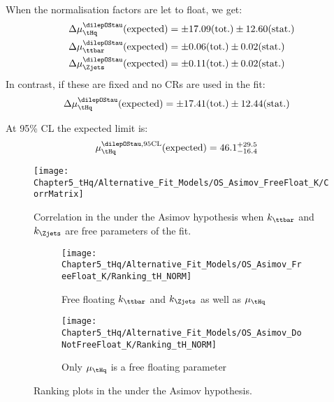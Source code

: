 When the normalisation factors are let to float, we get:
\begin{align*}
	\Delta \mu_{\tHq}^{\dilepOStau} (\text{expected})   &= \pm 17.09 (\text{tot.}) \pm 12.60 (\text{stat.}) \\
	\Delta \mu_{\ttbar}^{\dilepOStau} (\text{expected})  &= \pm 0.06 (\text{tot.}) \pm 0.02 (\text{stat.}) \\
	\Delta \mu_{\Zjets}^{\dilepOStau} (\text{expected}) &= \pm 0.11 (\text{tot.}) \pm 0.02 (\text{stat.}) \\
\end{align*}
In contrast, if these are fixed and no CRs are used in the fit:
\begin{align*}
	\Delta \mu_{\tHq}^{\dilepOStau} (\text{expected})   &= \pm 17.41  (\text{tot.}) \pm 12.44 (\text{stat.}) 
\end{align*}


At 95\% CL the expected limit is:
\begin{align*}
	\mu_{\tHq}^{\dilepOStau, \text{95CL}} (\text{expected})   &= 46.1^{+29.5}_{-16.4}
\end{align*}


\begin{figure}[h]
\centering
 \texttt{[image: Chapter5\_tHq/Alternative\_Fit\_Models/OS\_Asimov\_FreeFloat\_K/CorrMatrix]}
\caption{Correlation in the \dilepOStau under the Asimov hypothesis when $k_{\ttbar}$ and $k_{\Zjets}$ are free parameters of the fit.} 
\label{fig:Other:Asimov:OS:Correlation}
\end{figure}
 

\begin{figure}[h]
\centering
\begin{subfigure}{.5\textwidth}
  \centering
  \texttt{[image: Chapter5\_tHq/Alternative\_Fit\_Models/OS\_Asimov\_FreeFloat\_K/Ranking\_tH\_NORM]}
  \caption{Free floating $k_{\ttbar}$ and $k_{\Zjets}$ as well as $\mu_{\tHq}$}
\end{subfigure}%
\begin{subfigure}{.5\textwidth}
  \centering
  \texttt{[image: Chapter5\_tHq/Alternative\_Fit\_Models/OS\_Asimov\_DoNotFreeFloat\_K/Ranking\_tH\_NORM]}
  \caption{Only $\mu_{\tHq}$ is a free floating parameter}
\end{subfigure}
\caption{Ranking plots in the \dilepOStau under the Asimov hypothesis.}
\label{fig:Alternative:PreFit:OS:Rankings}
\end{figure}



